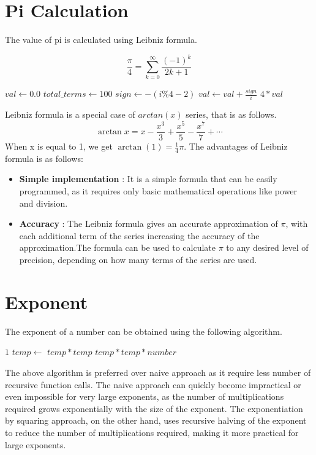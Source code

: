 \documentclass{report}
\begin{document}
\section{Pi Calculation}
\begin{flushleft}
  The value of pi is calculated using Leibniz formula.
\end{flushleft}
$${\frac {\pi }{4}}=\sum _{k=0}^{\infty }{\frac {(-1)^{k}}{2k+1}}$$
\begin{algorithmic}[1]
        \State $val \gets 0.0$
        \State $total\_terms \gets 100$
            \State $sign \gets -(i\%4-2)$
            \State $val \gets val + \frac{sign}{i}$
        \EndFor
        \State \Return $4 * val$
    \EndFunction
\end{algorithmic}
\begin{flushleft}
  Leibniz formula is a special case of $arctan(x)$ series, that is as follows.
  $$\arctan x=x-{\frac {x^{3}}{3}}+{\frac {x^{5}}{5}}-{\frac {x^{7}}{7}}+\cdots$$
  When x is equal to 1, we get $\arctan(1) = {\frac{1}{4}}\pi.$
  The advantages of Leibniz formula is as follows:
  \begin{itemize}
    \item \textbf{Simple implementation} : It is a simple formula that can be easily programmed, as it requires only basic mathematical operations like power and division.
    \item \textbf{Accuracy} : The Leibniz formula gives an accurate approximation of $\pi$, with each additional term of the series increasing the accuracy of the approximation.The formula can be used to calculate $\pi$ to any desired level of precision, depending on how many terms of the series are used.
  \end{itemize}
\end{flushleft}
\section{Exponent}
\begin{flushleft}
The exponent of a number can be obtained using the following algorithm.
\end{flushleft}
\begin{algorithmic}[1]
        \State \Return $1$
    \EndIf
    \State $temp \gets$ 
        \State \Return $temp * temp$
    \Else
        \State \Return $temp * temp * number$
    \EndIf
\EndFunction
\end{algorithmic}
\begin{flushleft}
  The above algorithm is preferred over naive approach as it require less number of recursive function calls.
  The naive approach can quickly become impractical or even impossible for very large exponents, as the number of multiplications required grows exponentially with the size of the exponent. The exponentiation by squaring approach, on the other hand, uses recursive halving of the exponent to reduce the number of multiplications required, making it more practical for large exponents.
\end{flushleft}
\end{document}
